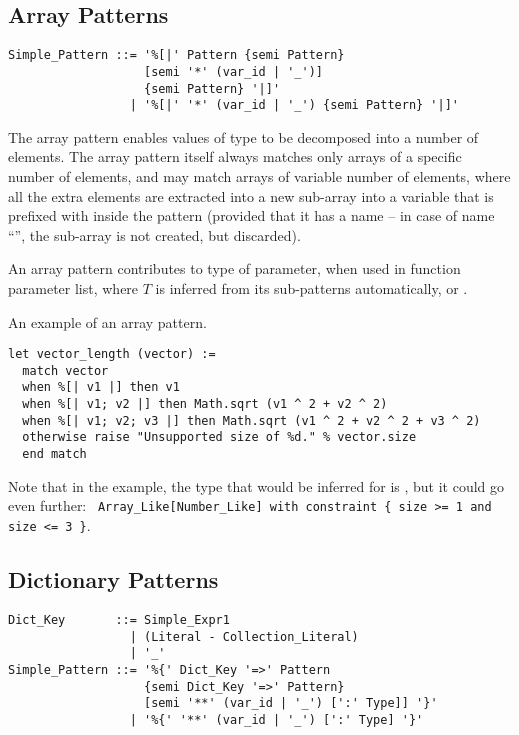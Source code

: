 \subsection{Array Patterns}
\label{sec:array-patterns}

\syntax\begin{lstlisting}
Simple_Pattern ::= '%[|' Pattern {semi Pattern} 
                   [semi '*' (var_id | '_')] 
                   {semi Pattern} '|]'
                 | '%[|' '*' (var_id | '_') {semi Pattern} '|]'
\end{lstlisting}

The array pattern enables values of  type to be decomposed into a number of elements. The array pattern itself always matches only arrays of a specific number of elements, and may match arrays of variable number of elements, where all the extra elements are extracted into a new sub-array into a variable that is prefixed with \code{*} inside the pattern (provided that it has a name -- in case of name ``\code{_}'', the sub-array is not created, but discarded). 

An array pattern contributes  to type of parameter, when used in function parameter list, where $T$ is inferred from its sub-patterns automatically, or . 

\example An example of an array pattern.
\begin{lstlisting}[deletekeywords={of}]
let vector_length (vector) := 
  match vector 
  when %[| v1 |] then v1
  when %[| v1; v2 |] then Math.sqrt (v1 ^ 2 + v2 ^ 2)
  when %[| v1; v2; v3 |] then Math.sqrt (v1 ^ 2 + v2 ^ 2 + v3 ^ 2)
  otherwise raise "Unsupported size of %d." % vector.size
  end match
\end{lstlisting}
Note that in the example, the type that would be inferred for  is , but it could go even further: ~\lstinline!Array_Like[Number_Like] with constraint { size >= 1 and size <= 3 }!. 






\subsection{Dictionary Patterns}
\label{sec:dict-patterns}

\syntax\begin{lstlisting}
Dict_Key       ::= Simple_Expr1
                 | (Literal - Collection_Literal)
                 | '_'
Simple_Pattern ::= '%{' Dict_Key '=>' Pattern 
                   {semi Dict_Key '=>' Pattern}
                   [semi '**' (var_id | '_') [':' Type]] '}'
                 | '%{' '**' (var_id | '_') [':' Type] '}'
\end{lstlisting}

